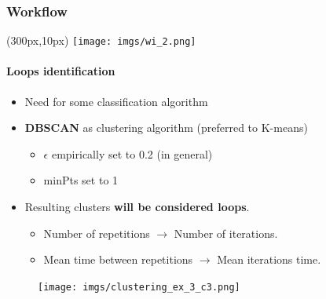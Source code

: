 \documentclass{beamer}
\begin{document}
\begin{frame}
\frametitle{Workflow}
\begin{textblock*}{5cm}(300px,10px) %
	\texttt{[image: imgs/wi\_2.png]}
\end{textblock*}
\framesubtitle{Loops identification}
\begin{multicols}{2}
\begin{itemize}
	\item Need for some classification algorithm
	\item \textbf{DBSCAN} as clustering algorithm (preferred to K-means)
	\begin{itemize}
		\item $\epsilon$ empirically set to 0.2 (in general)
		\item minPts set to 1
	\end{itemize}
	\item Resulting clusters \textbf{will be considered loops}.
	\begin{itemize}
		\item Number of repetitions $\rightarrow$ Number of iterations.
		\item Mean time between repetitions $\rightarrow$ Mean iterations time.
	\end{itemize}
\end{itemize}
\columnbreak
\begin{figure}
	\texttt{[image: imgs/clustering\_ex\_3\_c3.png]}
\end{figure}
\end{multicols}
\end{frame}
\end{document}
